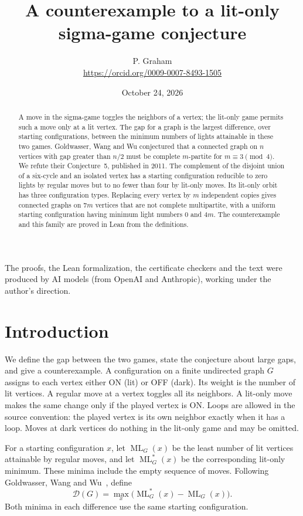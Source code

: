 \documentclass[11pt]{article}
\title{A counterexample to a lit-only sigma-game conjecture}
\author{P. Graham\\ \small\url{https://orcid.org/0009-0007-8493-1505}}
\date{October 24, 2026}
\newcommand{\ML}{\operatorname{ML}}
\begin{document}
\maketitle
\begin{abstract}
A move in the sigma-game toggles the neighbors of a vertex; the lit-only
game permits such a move only at a lit vertex. The gap for a
graph is the largest difference, over starting configurations, between
the minimum numbers of lights attainable in these two games.
Goldwasser, Wang and Wu conjectured that a connected graph on $n$ vertices
with gap greater than $n/2$ must be complete $m$-partite for
$m\equiv3\pmod4$. We refute their Conjecture~5, published in 2011.
The complement of the disjoint union of a six-cycle and an isolated vertex has a starting
configuration reducible to zero lights by regular moves but to no fewer
than four by lit-only moves. Its lit-only orbit has three configuration
types. Replacing every vertex by $m$ independent copies gives connected
graphs on $7m$ vertices that are not complete multipartite, with a uniform
starting configuration having minimum light numbers $0$ and $4m$.
The counterexample and this family are proved in Lean from the definitions.
\end{abstract}

\noindent The proofs, the Lean formalization, the certificate checkers and the text were produced by AI models (from OpenAI and Anthropic), working under the author's direction.

\section{Introduction}
We define the gap between the two games, state the conjecture about large
gaps, and give a counterexample.
A configuration on a finite undirected graph $G$ assigns to each vertex
either ON (lit) or OFF (dark). Its weight is the number of lit vertices.
A regular move at a vertex toggles all its
neighbors. A lit-only move makes the same change only if the played
vertex is ON. Loops are allowed in the source convention: the played
vertex is its own neighbor exactly when it has a loop. Moves at dark
vertices do nothing in the lit-only game and may be omitted.

For a starting configuration $x$, let $\ML_G(x)$ be the least number of
lit vertices attainable by regular moves, and let $\ML_G^*(x)$ be the
corresponding lit-only minimum. These minima include the empty sequence
of moves. Following Goldwasser, Wang and Wu~\cite{GWW}, define
\[
 \mathcal D(G)=\max_x\bigl(\ML_G^*(x)-\ML_G(x)\bigr).
\]
Both minima in each difference use the same starting configuration.
\end{document}
